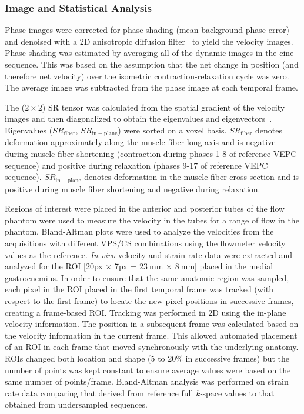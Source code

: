 \subsubsection{Image and Statistical Analysis}
Phase images were corrected for phase shading (mean background phase error) and denoised with a 2D anisotropic diffusion filter~\cite{RNCS17} to yield the velocity images. 
Phase shading was estimated by averaging all of the dynamic images in the cine sequence. 
This was based on the assumption that the net change in position (and therefore net velocity) over the isometric contraction-relaxation cycle was zero. 
The average image was subtracted from the phase image at each temporal frame. 

The ($2 \times 2$) SR tensor was calculated from the spatial gradient of the velocity images and then diagonalized to obtain the eigenvalues and eigenvectors~\cite{RNS16, Malis:2018fr}. 
Eigenvalues ($SR_{\mathrm{fiber}}$, $SR_{\mathrm{in-plane}}$) were sorted on a voxel basis. 
$SR_{\mathrm{fiber}}$ denotes deformation approximately along the muscle fiber long axis and is negative during muscle fiber shortening (contraction during phases 1-8 of reference VEPC sequence) and positive during relaxation (phases 9-17 of reference VEPC sequence). 
$SR_{\mathrm{in-plane}}$ denotes deformation in the muscle fiber cross-section and is positive during muscle fiber shortening and negative during relaxation.

Regions of interest were placed in the anterior and posterior tubes of the flow phantom were used to measure the velocity in the tubes for a range of flow in the phantom. 
Bland-Altman plots were used to analyze the velocities from the acquisitions with different VPS/CS combinations using the flowmeter velocity values as the reference. 
\textit{In-vivo} velocity and strain rate data were extracted and analyzed for the ROI [20px $\times$ 7px = $\SI{23}{\milli\meter}$ $\times$ $\SI{8}{\milli\meter}$] placed in the medial gastrocnemius. 
In order to ensure that the same anatomic region was sampled, each pixel in the ROI placed in the first temporal frame was tracked (with respect to the first frame) to locate the new pixel positions in successive frames, creating a frame-based ROI. 
Tracking was performed in 2D using the in-plane velocity information. 
The position in a subsequent frame was calculated based on the velocity information in the current frame. 
This allowed automated placement of an ROI in each frame that moved synchronously with the underlying anatomy. 
ROIs changed both location and shape (5 to 20\% in successive frames) but the number of points was kept constant to ensure average values were based on the same number of points/frame. 
Bland-Altman analysis was performed on strain rate data comparing that derived from reference full \mbox{\textit{k-}space} values to that obtained from undersampled sequences.
